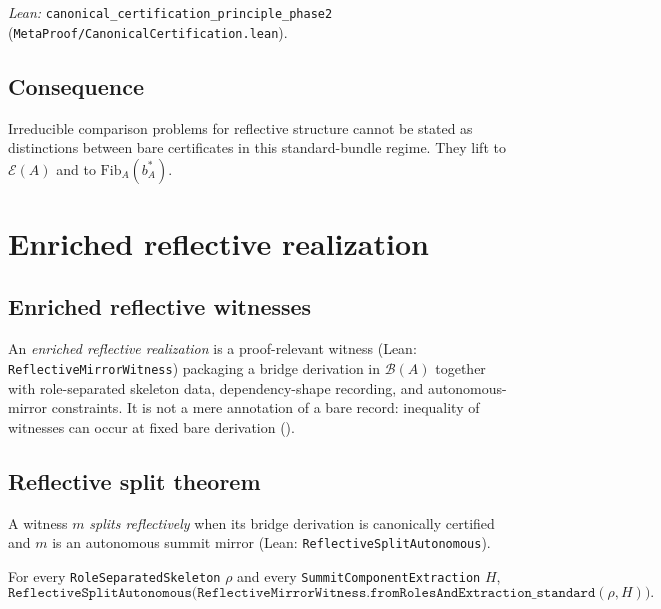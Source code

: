 \documentclass[11pt]{article}
\begin{document}
\noindent\emph{Lean:} \texttt{canonical\_certification\_principle\_phase2} (\texttt{MetaProof/CanonicalCertification.lean}).

\subsection{Consequence}\label{sec:canonical-cert-consequence}
Irreducible comparison problems for reflective structure cannot be stated as distinctions between bare certificates in this standard-bundle regime. They lift to $\mathcal{E}(A)$ and to $\mathrm{Fib}_A(b^\ast_A)$.

\section{Enriched reflective realization}\label{sec:enriched-realization}

\subsection{Enriched reflective witnesses}\label{sec:enriched-realization-witnesses}
An \emph{enriched reflective realization} is a proof-relevant witness (Lean: \texttt{ReflectiveMirrorWitness}) packaging a bridge derivation in $\mathcal{B}(A)$ together with role-separated skeleton data, dependency-shape recording, and autonomous-mirror constraints. It is not a mere annotation of a bare record: inequality of witnesses can occur at fixed bare derivation ().

\subsection{Reflective split theorem}\label{sec:enriched-realization-split}
\begin{definition}\label{def:reflective-split}
A witness $m$ \emph{splits reflectively} when its bridge derivation is canonically certified and $m$ is an autonomous summit mirror (Lean: \texttt{ReflectiveSplitAutonomous}).
\end{definition}

\begin{theorem}\label{thm:reflective-split}
For every \texttt{RoleSeparatedSkeleton} $\rho$ and every \texttt{SummitComponentExtraction} $H$,
\[
  \texttt{ReflectiveSplitAutonomous}\bigl(\texttt{ReflectiveMirrorWitness.fromRolesAndExtraction\_standard}(\rho,H)\bigr).
\]
\end{theorem}
\end{document}
